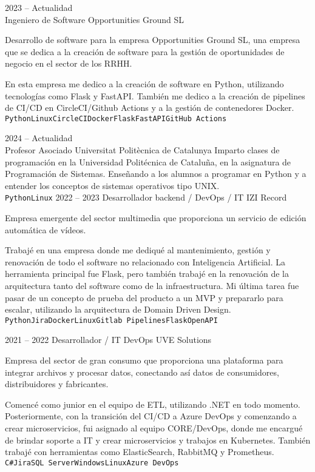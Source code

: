 \documentclass[9pt]{developercv} %
\begin{document}
\begin{entrylist}
	\entry
	{2023 -- Actualidad\\}
	{Ingeniero de Software}
	{Opportunities Ground SL}
	{
		Desarrollo de software para la empresa Opportunities Ground SL, una empresa que se dedica a la creación de software para la gestión de oportunidades de negocio en el sector de los RRHH.

		En esta empresa me dedico a la creación de software en Python, utilizando tecnologías como Flask y FastAPI. También me dedico a la creación de pipelines de CI/CD en CircleCI/Github Actions y a la gestión de contenedores Docker.
		\\ \texttt{Python}\slashsep\texttt{Linux}\slashsep\texttt{CircleCI}\slashsep\texttt{Docker}\slashsep\texttt{Flask}\slashsep\texttt{FastAPI}\slashsep\texttt{GitHub Actions}
	}
	\entry
	{2024 -- Actualidad\\}
	{Profesor Asociado}
	{Universitat Politècnica de Catalunya}
	{
		Imparto clases de programación en la Universidad Politécnica de Cataluña, en la asignatura de Programación de Sistemas. Enseñando a los alumnos a programar en Python y a entender los conceptos de sistemas operativos tipo UNIX.
		\\ \texttt{Python}\slashsep\texttt{Linux}
	}
	\entry
	{2022 -- 2023}
	{Desarrollador backend / DevOps / IT}
	{IZI Record}
	{Empresa emergente del sector multimedia que proporciona un servicio de edición automática de vídeos.

		Trabajé en una empresa donde me dediqué al mantenimiento, gestión y renovación de todo el software no relacionado con Inteligencia Artificial. La herramienta principal fue Flask, pero también trabajé en la renovación de la arquitectura tanto del software como de la infraestructura. Mi última tarea fue pasar de un concepto de prueba del producto a un MVP y prepararlo para escalar, utilizando la arquitectura de Domain Driven Design.
		\\ \texttt{Python}\slashsep\texttt{Jira}\slashsep\texttt{Docker}\slashsep\texttt{Linux}\slashsep\texttt{Gitlab Pipelines}\slashsep\texttt{Flask}\slashsep\texttt{OpenAPI}}
	\entry
	{2021 -- 2022}
	{Desarrollador / IT DevOps}
	{UVE Solutions}
	{Empresa del sector de gran consumo que proporciona una plataforma para integrar archivos y procesar datos, conectando así datos de consumidores, distribuidores y fabricantes.

		Comencé como junior en el equipo de ETL, utilizando .NET en todo momento. Posteriormente, con la transición del CI/CD a Azure DevOps y comenzando a crear microservicios, fui asignado al equipo CORE/DevOps, donde me encargué de brindar soporte a IT y crear microservicios y trabajos en Kubernetes. También trabajé con herramientas como ElasticSearch, RabbitMQ y Prometheus.
		\\ \texttt{C\#}\slashsep\texttt{Jira}\slashsep\texttt{SQL Server}\slashsep\texttt{Windows}\slashsep\texttt{Linux}\slashsep\texttt{Azure DevOps}}
\end{entrylist}
\end{document}
